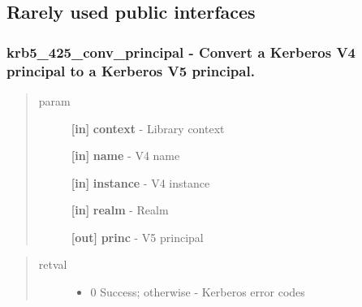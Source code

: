 \documentclass[letterpaper,10pt,english]{sphinxmanual}
\begin{document}
\subsection{Rarely used public interfaces}
\label{appdev/refs/api/index:rarely-used-public-interfaces}

\subsubsection{krb5\_425\_conv\_principal -  Convert a Kerberos V4 principal to a Kerberos V5 principal.}
\label{appdev/refs/api/krb5_425_conv_principal:krb5-425-conv-principal-convert-a-kerberos-v4-principal-to-a-kerberos-v5-principal}\label{appdev/refs/api/krb5_425_conv_principal::doc}

\begin{fulllineitems}
\label{appdev/refs/api/krb5_425_conv_principal:krb5_425_conv_principal}
\end{fulllineitems}

\begin{quote}\begin{description}
\item[{param}] \leavevmode
\textbf{{[}in{]}} \textbf{context} - Library context

\textbf{{[}in{]}} \textbf{name} - V4 name

\textbf{{[}in{]}} \textbf{instance} - V4 instance

\textbf{{[}in{]}} \textbf{realm} - Realm

\textbf{{[}out{]}} \textbf{princ} - V5 principal

\end{description}\end{quote}
\begin{quote}\begin{description}
\item[{retval}] \leavevmode\begin{itemize}
\item {} 
0   Success; otherwise - Kerberos error codes

\end{itemize}

\end{description}\end{quote}
\end{document}
